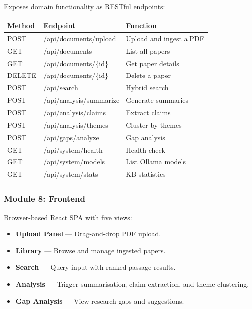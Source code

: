 \documentclass[12pt,a4paper]{article}
\begin{document}
Exposes domain functionality as RESTful endpoints:

\begin{center}
\begin{tabularx}{\textwidth}{|l|l|X|}
    \hline
    \textbf{Method} & \textbf{Endpoint} & \textbf{Function} \\ \hline
    POST   & /api/documents/upload   & Upload and ingest a PDF \\ \hline
    GET    & /api/documents          & List all papers \\ \hline
    GET    & /api/documents/\{id\}   & Get paper details \\ \hline
    DELETE & /api/documents/\{id\}   & Delete a paper \\ \hline
    POST   & /api/search             & Hybrid search \\ \hline
    POST   & /api/analysis/summarize & Generate summaries \\ \hline
    POST   & /api/analysis/claims    & Extract claims \\ \hline
    POST   & /api/analysis/themes    & Cluster by themes \\ \hline
    POST   & /api/gaps/analyze       & Gap analysis \\ \hline
    GET    & /api/system/health      & Health check \\ \hline
    GET    & /api/system/models      & List Ollama models \\ \hline
    GET    & /api/system/stats       & KB statistics \\ \hline
\end{tabularx}
\end{center}

\subsubsection{Module 8: Frontend}

Browser-based React SPA with five views:
\begin{itemize}[leftmargin=2em]
    \item \textbf{Upload Panel} --- Drag-and-drop PDF upload.
    \item \textbf{Library} --- Browse and manage ingested papers.
    \item \textbf{Search} --- Query input with ranked passage results.
    \item \textbf{Analysis} --- Trigger summarisation, claim extraction,
          and theme clustering.
    \item \textbf{Gap Analysis} --- View research gaps and suggestions.
\end{itemize}
\end{document}
